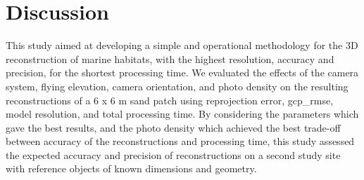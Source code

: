 \section{Discussion}\label{chapitre1_4}
This study aimed at developing a simple and operational methodology for the 3D reconstruction of marine habitats, with the highest resolution, accuracy and precision, for the shortest processing time. We evaluated the effects of the camera system, flying elevation, camera orientation, and photo density on the resulting reconstructions of a 6 x 6 m sand patch using reprojection error, \acrshort{gcp_rmse}, model resolution, and total processing time. By considering the parameters which gave the best results, and the photo density which achieved the best trade-off between accuracy of the reconstructions and processing time, this study assessed the expected accuracy and precision of reconstructions on a second study site with reference objects of known dimensions and geometry.

